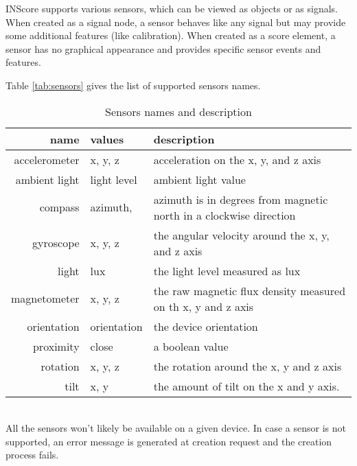 


\label{sensors}

INScore supports various sensors, which can be viewed as objects or as signals. When created as a signal node, a sensor behaves like any signal but may provide some additional features (like calibration). When created as a score element, a sensor has no graphical appearance and provides specific sensor events and features.

Table \ref{tab:sensors} gives the list of supported sensors names.

\label{tab:sensors}

\begin{table*}[htbp]
\begin{center}
\begin{tabular}{rll}
\hline
name & values		&	description \\
\hline
accelerometer	& x, y, z			& acceleration on the x, y, and z axis \\
ambient light	& light level		& ambient light value \\
compass			& azimuth,  		& azimuth is in degrees from magnetic north in a clockwise direction \\
gyroscope		& x, y, z			& the angular velocity around the x, y, and z axis\\
light			& lux				& the light level measured as lux\\
magnetometer	& x, y, z			& the raw magnetic flux density measured on th x, y and z axis\\
orientation		& orientation		& the device orientation \\
proximity		& close				& a boolean value \\
rotation		& x, y, z			& the rotation around the x, y and z axis \\
tilt			& x, y 				& the amount of tilt on the x and y axis.\\
\hline
\end{tabular}
\end{center}
\caption{Sensors names and description}
\end{table*}

\note\\
All the sensors won't likely be available on a given device. In case a sensor is not supported, an error message is generated at creation request and the creation process fails.




